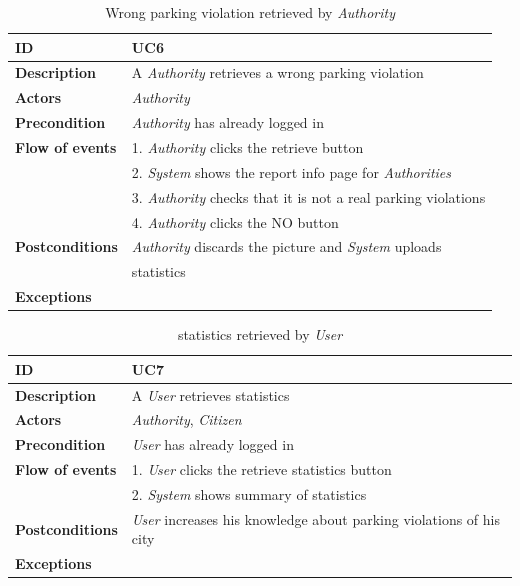 \documentclass{article}
\begin{document}
\clearpage
\begin{table}
    \begin{center}
    \centering
\begin{tabular}{ | l | l |}
\hline
\textbf{ID} & UC6 \\
\hline
\textbf{Description} & A \textit{Authority} retrieves a wrong parking violation  \\
\hline
\textbf{Actors} & \textit{Authority} \\
\hline
\textbf{Precondition} & \textit{Authority} has already logged in \\
\hline
\textbf{Flow of events} & 1. \textit{Authority} clicks the retrieve button \\
                        & 2. \textit{System} shows the report info page for \textit{Authorities} \\
                        & 3. \textit{Authority} checks that it is not a real parking violations \\
                        & 4. \textit{Authority} clicks the NO button  \\
\hline
\textbf{Postconditions} & \textit{Authority} discards the picture and \textit{System} uploads   \\
                        &  statistics \\
\hline
\textbf{Exceptions} & \\ 
\hline
\end{tabular}
\caption{Wrong parking violation retrieved by \textit{Authority} }
\end{center}
\end{table}

\clearpage
\begin{table}
    \begin{center}
    \centering
\begin{tabular}{ | l | l |}
\hline
\textbf{ID} & UC7 \\
\hline
\textbf{Description} & A \textit{User} retrieves statistics  \\
\hline
\textbf{Actors} & \textit{Authority}, \textit{Citizen} \\
\hline
\textbf{Precondition} & \textit{User} has already logged in \\
\hline
\textbf{Flow of events} & 1. \textit{User} clicks the retrieve statistics button \\
                        & 2. \textit{System} shows summary of statistics \\
\hline
\textbf{Postconditions} & \textit{User} increases his knowledge about parking violations of his city  \\
\hline
\textbf{Exceptions} & \\ 
\hline
\end{tabular}
\caption{statistics retrieved by \textit{User} }
\end{center}
\end{table}
\end{document}
